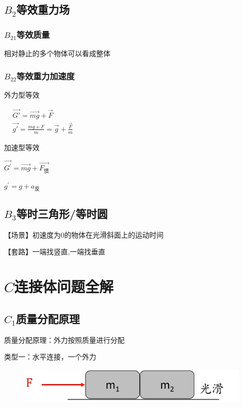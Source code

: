 \documentclass[lang=cn,10pt]{elegantbook}
\begin{document}
    \subsection{$B_{2}$等效重力场}
     \subsubsection{$B_{21}$等效质量}
     相对静止的多个物体可以看成整体
     \subsubsection{$B_{22}$等效重力加速度}
     外力型等效
     
     $\begin{aligned}&\overrightarrow{G'}=\overrightarrow{mg}+\overrightarrow{F}\\&\overrightarrow{g'}=\frac{mg+F}{m}=\overrightarrow{g}+\frac{\overrightarrow{F}}{m}\end{aligned}$
     
     加速型等效
     
     $\overrightarrow{G^{\prime}}=\overrightarrow{mg}+\overrightarrow{F_{\text{惯}}}$
     
     $g^{\prime}=g+a_{\text{反}}$
     \subsection{$B_{3}$等时三角形/等时圆}
     $\text{【场景】初速度为0的物体在光滑斜面上的运动时间}$
     
     $\text{【套路】一端找竖直,一端找垂直}$
     \vspace{3cm}
     \section{$C$连接体问题全解}
     \subsection{$C_{1}$质量分配原理}
     
     质量分配原理：外力按照质量进行分配
     
     类型一：水平连接，一个外力
     \begin{figure}[H]
     	\centering
     	\includegraphics[width=0.4\linewidth]{image/31}
     \end{figure}
     
\end{document}
